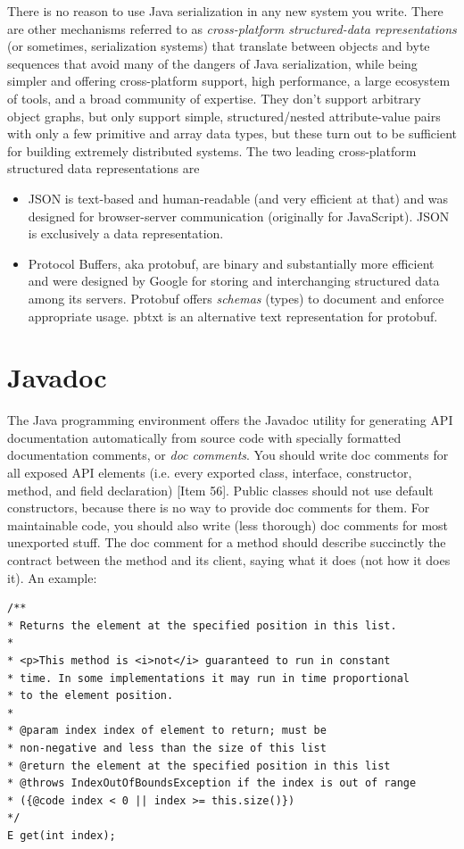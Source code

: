 \documentclass[table, xcdraw]{article}%
\begin{document}
There is no reason to use Java serialization in any new system you write. There are other mechanisms referred to as \emph{cross-platform structured-data representations} (or sometimes, serialization systems) that translate between objects and byte sequences that avoid many of the dangers of Java serialization, while being simpler and offering cross-platform support, high performance, a large ecosystem of tools, and a broad community of expertise. They don’t support arbitrary object graphs, but only support simple, structured/nested attribute-value pairs with only a few primitive and array data types, but these turn out to be sufficient for building extremely distributed systems. The two leading cross-platform structured data representations are

\begin{itemize}
    \item JSON is text-based and human-readable (and very efficient at that) and was designed for browser-server communication (originally for JavaScript). JSON is exclusively a data representation.
    \item Protocol Buffers, aka protobuf, are binary and substantially more efficient and were designed by Google for storing and interchanging structured data among its servers. Protobuf offers \emph{schemas} (types) to document and enforce appropriate usage. pbtxt is an alternative text representation for protobuf.
\end{itemize}

\section{Javadoc}

The Java programming environment offers the Javadoc utility for generating API documentation automatically from source code with specially formatted documentation comments, or \emph{doc comments}. You should write doc comments for all exposed API elements (i.e. every exported class, interface, constructor, method, and field declaration) [Item 56]. Public classes should not use default constructors, because there is no way to provide doc comments for them. For maintainable code, you should also write (less thorough) doc comments for most unexported stuff. The doc comment for a method should describe succinctly the contract between the method and its client, saying what it does (not how it does it). An example:

\begin{verbatim}
/**
* Returns the element at the specified position in this list.
*
* <p>This method is <i>not</i> guaranteed to run in constant
* time. In some implementations it may run in time proportional
* to the element position.
*
* @param index index of element to return; must be
* non-negative and less than the size of this list
* @return the element at the specified position in this list
* @throws IndexOutOfBoundsException if the index is out of range
* ({@code index < 0 || index >= this.size()})
*/
E get(int index);
\end{verbatim}
\end{document}
